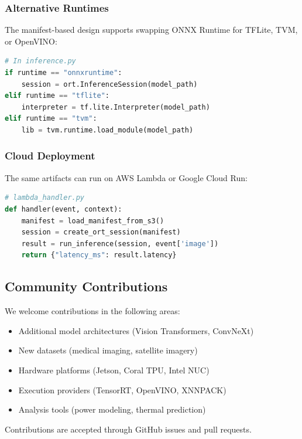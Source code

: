 \documentclass[review]{elsarticle}
\begin{document}
\subsubsection{Alternative Runtimes}

The manifest-based design supports swapping ONNX Runtime for TFLite, TVM, or OpenVINO:

\begin{lstlisting}[language=Python]
# In inference.py
if runtime == "onnxruntime":
    session = ort.InferenceSession(model_path)
elif runtime == "tflite":
    interpreter = tf.lite.Interpreter(model_path)
elif runtime == "tvm":
    lib = tvm.runtime.load_module(model_path)
\end{lstlisting}

\subsubsection{Cloud Deployment}

The same artifacts can run on AWS Lambda or Google Cloud Run:

\begin{lstlisting}[language=Python]
# lambda_handler.py
def handler(event, context):
    manifest = load_manifest_from_s3()
    session = create_ort_session(manifest)
    result = run_inference(session, event['image'])
    return {"latency_ms": result.latency}
\end{lstlisting}

\subsection{Community Contributions}

We welcome contributions in the following areas:

\begin{itemize}
\item Additional model architectures (Vision Transformers, ConvNeXt)
\item New datasets (medical imaging, satellite imagery)
\item Hardware platforms (Jetson, Coral TPU, Intel NUC)
\item Execution providers (TensorRT, OpenVINO, XNNPACK)
\item Analysis tools (power modeling, thermal prediction)
\end{itemize}

Contributions are accepted through GitHub issues and pull requests.

\end{document}
